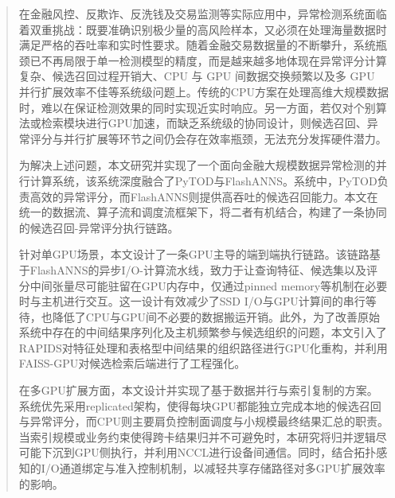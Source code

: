 

\begin{abstract}
在金融风控、反欺诈、反洗钱及交易监测等实际应用中，异常检测系统面临着双重挑战：既要准确识别极少量的高风险样本，又必须在处理海量数据时满足严格的吞吐率和实时性要求。随着金融交易数据量的不断攀升，系统瓶颈已不再局限于单一检测模型的精度，而是越来越多地体现在异常评分计算复杂、候选召回过程开销大、CPU 与 GPU 间数据交换频繁以及多 GPU 并行扩展效率不佳等系统级问题上\citep{aggarwal2017outlier,zhao2022tod}。传统的CPU方案在处理高维大规模数据时，难以在保证检测效果的同时实现近实时响应。另一方面，若仅对个别算法或检索模块进行GPU加速，而缺乏系统级的协同设计，则候选召回、异常评分与并行扩展等环节之间仍会存在效率瓶颈，无法充分发挥硬件潜力\citep{zhao2022tod,xiao2025flashanns}。

为解决上述问题，本文研究并实现了一个面向金融大规模数据异常检测的并行计算系统，该系统深度融合了PyTOD与FlashANNS。系统中，PyTOD负责高效的异常评分，而FlashANNS则提供高吞吐的候选召回能力。本文在统一的数据流、算子流和调度流框架下，将二者有机结合，构建了一条协同的候选召回-异常评分执行链路\citep{zhao2022tod,xiao2025flashanns}。

针对单GPU场景，本文设计了一条GPU主导的端到端执行链路。该链路基于FlashANNS的异步I/O-计算流水线，致力于让查询特征、候选集以及评分中间张量尽可能驻留在GPU内存中，仅通过pinned memory等机制在必要时与主机进行交互。这一设计有效减少了SSD I/O与GPU计算间的串行等待，也降低了CPU与GPU间不必要的数据搬运开销\citep{xiao2025flashanns,rapids_rmm_pinned,gds_overview}。此外，为了改善原始系统中存在的中间结果序列化及主机频繁参与候选组织的问题，本文引入了RAPIDS对特征处理和表格型中间结果的组织路径进行GPU化重构，并利用FAISS-GPU对候选检索后端进行了工程强化\citep{rapids_cudf_pandas,faiss_gpu_wiki}。

在多GPU扩展方面，本文设计并实现了基于数据并行与索引复制的方案。系统优先采用replicated架构，使得每块GPU都能独立完成本地的候选召回与异常评分，而CPU则主要肩负控制面调度与小规模最终结果汇总的职责\citep{cuvs_multi_gpu_nn,cuvs_dist_mode}。当索引规模或业务约束使得跨卡结果归并不可避免时，本研究将归并逻辑尽可能下沉到GPU侧执行，并利用NCCL进行设备间通信。同时，结合拓扑感知的I/O通道绑定与准入控制机制，以减轻共享存储路径对多GPU扩展效率的影响\citep{nccl_stream_semantics,gds_design_guide}。


\end{abstract}
